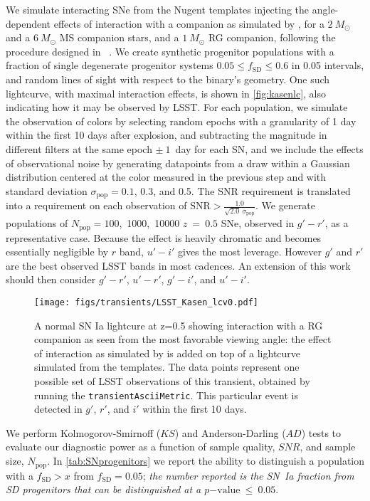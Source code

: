 We simulate interacting SNe from the Nugent templates \citep{Nugent02}
injecting the angle-dependent effects of interaction with a companion
as simulated by \citep{Kasen10}, for a $2~M_\odot$ and a $6~M_\odot$
MS companion stars, and a $1~M_\odot$ RG companion, following the
procedure designed in ~\citep{Bianco11}. We create synthetic progenitor
populations with a fraction of single degenerate progenitor systems
$0.05 \leq f_\mathrm{SD} \leq 0.6 $ in 0.05 intervals, and random lines of
sight with respect to the binary's geometry. One such lightcurve, with
maximal interaction effects, is shown in \autoref{fig:kasenlc}, also
indicating how it may be observed by LSST. For each population, we
simulate the observation of colors by selecting random epochs with a
granularity of 1 day within the first 10 days after explosion, and
subtracting the magnitude in different filters at the same epoch
$\pm~1$~day for each SN, and we include the effects of observational
noise by generating datapoints from a draw within a Gaussian
distribution centered at the color measured in the previous step and
with standard deviation $\sigma_\mathrm{pop} = 0.1$, 0.3, and 0.5.
The SNR requirement is
translated into a requirement on each
observation of $\mathrm{SNR} >
\frac{1.0}{\sqrt{2.0}~\sigma_\mathrm{pop}}$.
We generate populations of $N_\mathrm{pop}=100$,~1000,~10000 $z~=~0.5$ SNe,
observed in $g'-r'$, as a representative case. Because the effect is
heavily chromatic and becomes essentially negligible
by $r$ band, $u'-i'$ gives the most leverage. However $g'$ and $r'$
are the best observed LSST bands in most cadences. An extension of
this work should then consider $g'-r'$, $u'-r'$, $g'-i'$, and $u'-i'$.

\begin{figure}[hbt]
\centerline{
\texttt{[image: figs/transients/LSST\_Kasen\_lcv0.pdf]}
}
\caption{ A normal SN Ia lightcure at z=0.5 showing interaction with a
  RG companion as seen from the most favorable viewing angle: the
  effect of interaction as simulated by \citet{Kasen10} is added on
  top of a lightcurve simulated from the \citealt{Nugent02}
  templates. The data points represent one possible set of LSST
  observations of this transient, obtained by running the
  \texttt{transientAsciiMetric}.  This particular event is detected in
  $g'$, $r'$, and $i'$ within the first 10 days.}
\label{fig:kasenlc}
\end{figure}

We perform Kolmogorov-Smirnoff ($KS$) and Anderson-Darling ($AD$) tests
to evaluate our diagnostic power as a function of sample quality,
$SNR$, and sample size, $N_\mathrm{pop}$.  In
\autoref{tab:SNprogenitors} we report the ability to distinguish a
population with a $f_\mathrm{SD} > x$ from $f_\mathrm{SD}=0.05$; \emph{the
number reported is the SN~Ia fraction from SD progenitors that can be
distinguished at a $p\mathrm{-value}~\leq ~0.05$}.

